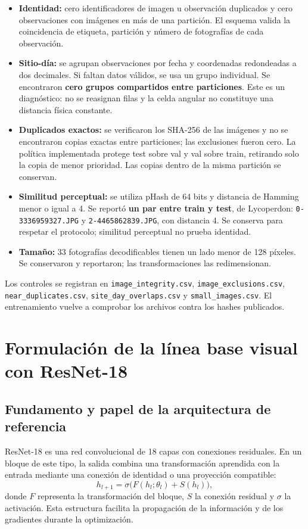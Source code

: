 \documentclass[11pt,a4paper]{article}
\newcommand{\archivo}[1]{\nolinkurl{#1}}
\begin{document}
\begin{itemize}
\item \textbf{Identidad:} cero identificadores de imagen u observación duplicados
y cero observaciones con imágenes en más de una partición. El esquema valida
la coincidencia de etiqueta, partición y número de fotografías de cada observación.
\item \textbf{Sitio-día:} se agrupan observaciones por fecha y coordenadas redondeadas
a dos decimales. Si faltan datos válidos, se usa un grupo individual. Se encontraron
\textbf{cero grupos compartidos entre particiones}. Este es un diagnóstico:
no se reasignan filas y la celda angular no constituye una distancia física constante.
\item \textbf{Duplicados exactos:} se verificaron los SHA-256 de las imágenes y no
se encontraron copias exactas entre particiones; las exclusiones fueron cero.
La política implementada protege test sobre val y val sobre train, retirando solo
la copia de menor prioridad. Las copias dentro de la misma partición se conservan.
\item \textbf{Similitud perceptual:} se utiliza pHash de 64 bits y distancia de
Hamming menor o igual a 4. Se reportó \textbf{un par entre train y test}, de
Lycoperdon: \archivo{0-3336959327.JPG} y \archivo{2-4465862839.JPG}, con distancia 4.
Se conserva para respetar el protocolo; similitud perceptual no prueba identidad.
\item \textbf{Tamaño:} 33 fotografías decodificables tienen un lado menor de 128
píxeles. Se conservaron y reportaron; las transformaciones las redimensionan.
\end{itemize}

Los controles se registran en \archivo{image_integrity.csv},
\archivo{image_exclusions.csv}, \archivo{near_duplicates.csv},
\archivo{site_day_overlaps.csv} y \archivo{small_images.csv}.
El entrenamiento vuelve a comprobar los archivos contra los hashes publicados.

\section{Formulación de la línea base visual con ResNet-18}

\subsection{Fundamento y papel de la arquitectura de referencia}

ResNet-18 es una red convolucional de 18 capas con conexiones residuales.
En un bloque de este tipo, la salida combina una transformación aprendida con
la entrada mediante una conexión de identidad o una proyección compatible:
\[
h_{l+1}=\sigma\bigl(F(h_l;\theta_l)+S(h_l)\bigr),
\]
donde \(F\) representa la transformación del bloque, \(S\) la conexión residual
y \(\sigma\) la activación. Esta estructura facilita la propagación de la
información y de los gradientes durante la optimización.
\end{document}
